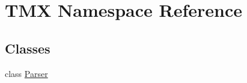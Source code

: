 \hypertarget{namespace_t_m_x}{}\section{T\+MX Namespace Reference}
\label{namespace_t_m_x}
\subsection*{Classes}
\begin{DoxyCompactItemize}
\item 
class \hyperlink{class_t_m_x_1_1_parser}{Parser}
\end{DoxyCompactItemize}
